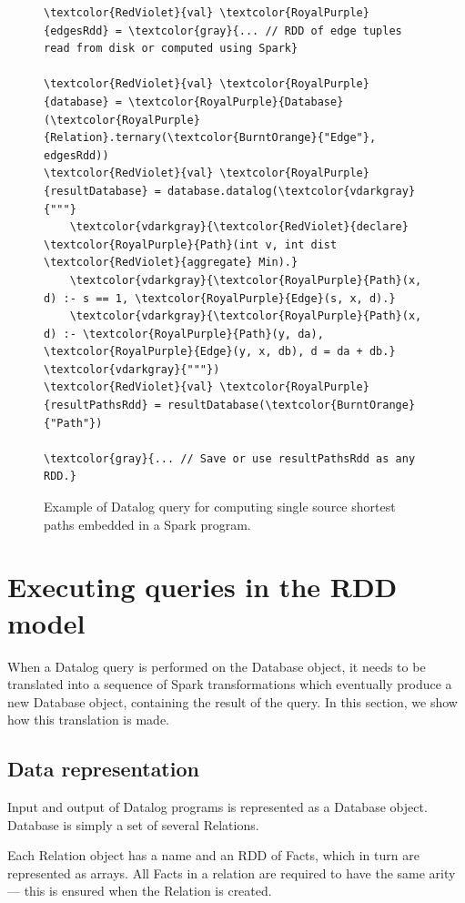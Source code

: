 \begin{figure}[!htbp]
  \centering
\begin{Verbatim}
\textcolor{RedViolet}{val} \textcolor{RoyalPurple}{edgesRdd} = \textcolor{gray}{... // RDD of edge tuples read from disk or computed using Spark}

\textcolor{RedViolet}{val} \textcolor{RoyalPurple}{database} = \textcolor{RoyalPurple}{Database}(\textcolor{RoyalPurple}{Relation}.ternary(\textcolor{BurntOrange}{"Edge"}, edgesRdd))
\textcolor{RedViolet}{val} \textcolor{RoyalPurple}{resultDatabase} = database.datalog(\textcolor{vdarkgray}{"""}
    \textcolor{vdarkgray}{\textcolor{RedViolet}{declare} \textcolor{RoyalPurple}{Path}(int v, int dist \textcolor{RedViolet}{aggregate} Min).}
    \textcolor{vdarkgray}{\textcolor{RoyalPurple}{Path}(x, d) :- s == 1, \textcolor{RoyalPurple}{Edge}(s, x, d).}
    \textcolor{vdarkgray}{\textcolor{RoyalPurple}{Path}(x, d) :- \textcolor{RoyalPurple}{Path}(y, da), \textcolor{RoyalPurple}{Edge}(y, x, db), d = da + db.}
\textcolor{vdarkgray}{"""})
\textcolor{RedViolet}{val} \textcolor{RoyalPurple}{resultPathsRdd} = resultDatabase(\textcolor{BurntOrange}{"Path"})

\textcolor{gray}{... // Save or use resultPathsRdd as any RDD.}
\end{Verbatim}
  \caption{Example of Datalog query for computing single source shortest paths embedded in a Spark program.\label{sdinspark}}
\end{figure}
\section{Executing \datalogra queries in the RDD model}

When a Datalog query is performed on the Database object, it needs to be translated into a sequence of Spark transformations which eventually produce a new Database object, containing the result of the query. In this section, we show how this translation is made.

\subsection{Data representation}

Input and output of Datalog programs is represented as a Database object. Database is simply a set of several Relations.

Each Relation object has a name and an RDD of Facts, which in turn are represented as arrays. All Facts in a relation are required to have the same arity --- this is ensured when the Relation is created.

